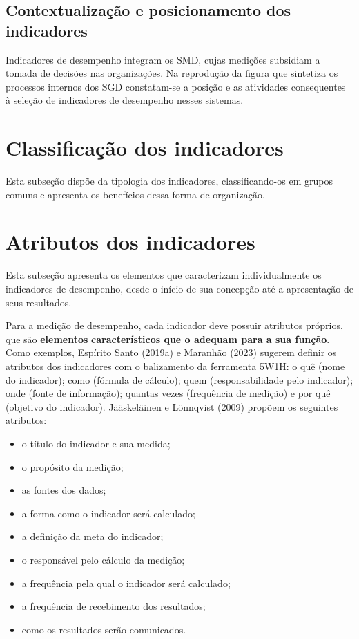 \documentclass[
  letterpaper,
  DIV=11,
  numbers=noendperiod]{scrreprt}
\begin{document}
\hypertarget{contextualizauxe7uxe3o-e-posicionamento-dos-indicadores}{%
\section{Contextualização e posicionamento dos
indicadores}\label{contextualizauxe7uxe3o-e-posicionamento-dos-indicadores}}

Indicadores de desempenho integram os SMD, cujas medições subsidiam a
tomada de decisões nas organizações. Na reprodução da figura que
sintetiza os processos internos dos SGD constatam-se a posição e as
atividades consequentes à seleção de indicadores de desempenho nesses
sistemas.

\hypertarget{classificauxe7uxe3o-dos-indicadores}{%
\chapter{Classificação dos
indicadores}\label{classificauxe7uxe3o-dos-indicadores}}

{Esta subseção dispõe da tipologia dos indicadores, classificando-os em
grupos comuns e apresenta os benefícios dessa forma de organização.}

\hypertarget{atributos-dos-indicadores}{%
\chapter{Atributos dos indicadores}\label{atributos-dos-indicadores}}

{Esta subseção apresenta os elementos que caracterizam individualmente
os indicadores de desempenho, desde o início de sua concepção até a
apresentação de seus resultados.}

Para a medição de desempenho, cada indicador deve possuir atributos
próprios, que são \textbf{elementos} \textbf{característicos que o
adequam para a sua função}. Como exemplos, Espírito Santo (2019a) e
Maranhão (2023) sugerem definir os atributos dos indicadores com o
balizamento da ferramenta 5W1H: o quê (nome do indicador); como (fórmula
de cálculo); quem (responsabilidade pelo indicador); onde (fonte de
informação); quantas vezes (frequência de medição) e por quê (objetivo
do indicador). Jääskeläinen e Lönnqvist (2009) propõem os seguintes
atributos:

\begin{itemize}
\item
  o título do indicador e sua medida;
\item
  o propósito da medição;
\item
  as fontes dos dados;
\item
  a forma como o indicador será calculado;
\item
  a definição da meta do indicador;
\item
  o responsável pelo cálculo da medição;
\item
  a frequência pela qual o indicador será calculado;
\item
  a frequência de recebimento dos resultados;
\item
  como os resultados serão comunicados.
\end{itemize}
\end{document}
